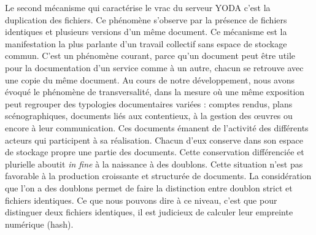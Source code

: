 Le second mécanisme qui caractérise le vrac du serveur YODA c’est la duplication des fichiers. Ce phénomène s’observe par la présence de fichiers identiques et plusieurs versions d’un même document. Ce mécanisme est la manifestation la plus parlante d’un travail collectif sans espace de stockage commun. C’est un phénomène courant, parce qu’un document peut être utile pour la documentation d’un service comme à un autre, chacun se retrouve avec une copie du même document. Au cours de notre développement, nous avons évoqué le phénomène de transversalité, dans la mesure où une même exposition peut regrouper des typologies documentaires variées : comptes rendus, plans scénographiques, documents liés aux contentieux, à la gestion des œuvres ou encore à leur communication. Ces documents émanent de l’activité des différents acteurs qui participent à sa réalisation. Chacun d’eux conserve dans son espace de stockage propre une partie des documents. Cette conservation différenciée et plurielle aboutit \textit{in fine} à la naissance à des doublons. Cette situation n’est pas favorable à la production croissante et structurée de documents. La considération que l’on a des doublons permet de faire la distinction entre doublon strict et fichiers identiques. Ce que nous pouvons dire à ce niveau, c'est que pour distinguer deux fichiers identiques, il est judicieux de calculer leur empreinte numérique (hash). 
